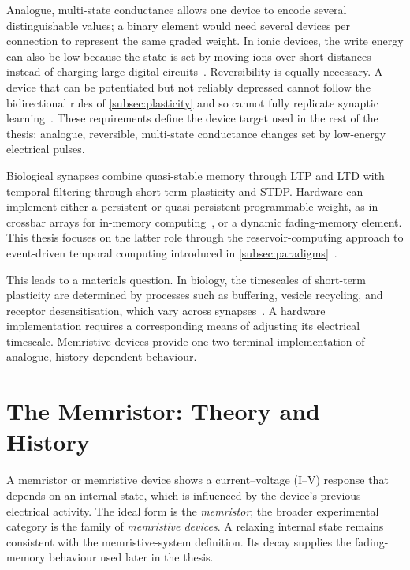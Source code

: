 \documentclass[12pt, twoside]{report}
\begin{document}
Analogue, multi-state conductance allows one device to encode several distinguishable values; a binary element would need several devices per connection to represent the same graded weight. In ionic devices, the write energy can also be low because the state is set by moving ions over short distances instead of charging large digital circuits~\cite{VanDeBurgt2017, VanDeBurgt2018}. Reversibility is equally necessary. A device that can be potentiated but not reliably depressed cannot follow the bidirectional rules of \cref{subsec:plasticity} and so cannot fully replicate synaptic learning~\cite{IelminiWong2018}. These requirements define the device target used in the rest of the thesis: analogue, reversible, multi-state conductance changes set by low-energy electrical pulses.

Biological synapses combine quasi-stable memory through LTP and LTD with temporal filtering through short-term plasticity and STDP. Hardware can implement either a persistent or quasi-persistent programmable weight, as in crossbar arrays for in-memory computing~\cite{IelminiWong2018}, or a dynamic fading-memory element. This thesis focuses on the latter role through the reservoir-computing approach to event-driven temporal computing introduced in \cref{subsec:paradigms}~\cite{Tanaka2019, Du2017, Midya2019, Zhong2021}.

This leads to a materials question. In biology, the timescales of short-term plasticity are determined by processes such as  buffering, vesicle recycling, and receptor desensitisation, which vary across synapses~\cite{ZuckerRegehr2002}. A hardware implementation requires a corresponding means of adjusting its electrical timescale. Memristive devices provide one two-terminal implementation of analogue, history-dependent behaviour.

\section{The Memristor: Theory and History}\label{sec:memristor_history}

A memristor or memristive device shows a current--voltage (I--V) response that depends on an internal state, which is influenced by the device's previous electrical activity. The ideal form is the \textit{memristor}; the broader experimental category is the family of \textit{memristive devices}. A relaxing internal state remains consistent with the memristive-system definition. Its decay supplies the fading-memory behaviour used later in the thesis.
\end{document}
